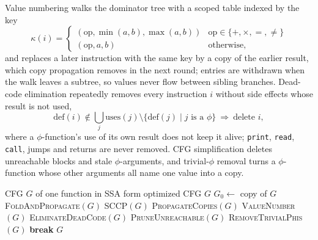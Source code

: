 \documentclass{ieeeaccess}
\begin{document}
Value numbering walks the dominator tree with a scoped table indexed by the key
\begin{equation}
\kappa(i)=\begin{cases}(\mathrm{op},\min(a,b),\max(a,b)) & \mathrm{op}\in\{+,\times,=,\neq\}\\ (\mathrm{op},a,b) & \text{otherwise,}\end{cases}
\label{eq:vn}
\end{equation}
and replaces a later instruction with the same key by a copy of the earlier result, which copy propagation removes in the next round; entries are withdrawn when the walk leaves a subtree, so values never flow between sibling branches. Dead-code elimination repeatedly removes every instruction $i$ without side effects whose result is not used,
\begin{equation}
\mathrm{def}(i)\notin \bigcup_{j}\mathrm{uses}(j)\setminus\{\mathrm{def}(j)\mid j\text{ is a }\phi\}\ \Rightarrow\ \text{delete } i,
\label{eq:dce}
\end{equation}
where a $\phi$-function's use of its own result does not keep it alive; \texttt{print}, \texttt{read}, \texttt{call}, jumps and returns are never removed. CFG simplification deletes unreachable blocks and stale $\phi$-arguments, and trivial-$\phi$ removal turns a $\phi$-function whose other arguments all name one value into a copy.

\begin{algorithm}[t]
\caption{Fixed-point driver of the optimizer}
\label{alg:opt}
\begin{algorithmic}[1]
\REQUIRE CFG $G$ of one function in SSA form
\ENSURE optimized CFG $G$
  \STATE $G_0 \gets$ copy of $G$
  \STATE \textsc{FoldAndPropagate}$(G)$ \COMMENT{\eqref{eq:fold}, \eqref{eq:cdiv}}
  \STATE \textsc{SCCP}$(G)$ 
  \STATE \textsc{PropagateCopies}$(G)$
  \STATE \textsc{ValueNumber}$(G)$ 
  \STATE \textsc{EliminateDeadCode}$(G)$ \COMMENT{\eqref{eq:dce}}
  \STATE \textsc{PruneUnreachable}$(G)$
  \STATE \textsc{RemoveTrivialPhis}$(G)$
    \STATE \textbf{break}
  \ENDIF
\ENDFOR
\RETURN $G$
\end{algorithmic}
\end{algorithm}
\end{document}

